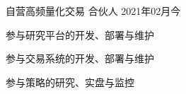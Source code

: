 
\begin{projitem}
    {自营高频量化交易}
    {合伙人}
    {2021年02月}{今}
    \item 参与研究平台的开发、部署与维护
    \item 参与交易系统的开发、部署与维护
    \item 参与策略的研究、实盘与监控
\end{projitem}



\endinput
